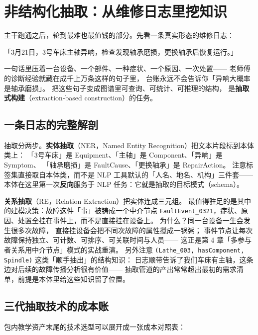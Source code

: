 \section{非结构化抽取：从维修日志里挖知识}

主干跑通之后，轮到最难也最值钱的部分。先看一条真实形态的维修日志：

\begin{center}
「3月21日，3号车床主轴异响，检查发现轴承磨损，更换轴承后恢复运行。」
\end{center}

一句话里压着一台设备、一个部件、一种症状、一个原因、一次处置——
老师傅的诊断经验就藏在成千上万条这样的句子里，
台账永远不会告诉你「异响大概率是轴承磨损」。
把这些句子变成图谱里可查询、可统计、可推理的结构，
是\textbf{抽取式构建}（extraction-based construction）的任务。

\subsection{一条日志的完整解剖}



抽取分两步。\textbf{实体抽取}（NER，Named Entity Recognition）把文本片段标到本体类上：
「3号车床」是 Equipment、「主轴」是 Component、「异响」是 Symptom、
「轴承磨损」是 FaultCause、「更换轴承」是 RepairAction。
注意标签集直接取自本体类，而不是 NLP 工具默认的「人名、地名、机构」三件套——
本体在这里第一次\textbf{反向}服务于 NLP 任务：它就是抽取的目标模式（schema）。

\textbf{关系抽取}（RE，Relation Extraction）把实体连成三元组。
最值得驻足的是其中的建模决策：故障这件「事」被铸成一个中介节点
\texttt{FaultEvent\_0321}，症状、原因、处置全挂在事件上，而不是直接挂在设备上。
为什么？同一台设备一生会发生很多次故障，
直接挂设备会把不同次故障的属性搅成一锅粥；
事件节点让每次故障保持独立、可计数、可排序、可关联时间与人员——
这正是第 4 章「多参与者关系用中介节点」模式的实战重演。
另外注意 \texttt{(Lathe\_003, hasComponent, Spindle)} 这类「顺手抽出」的结构知识：
日志顺带告诉了我们车床有主轴，这条边对后续的故障传播分析很有价值——
抽取管道的产出常常超出最初的需求清单，前提是本体里给这些知识留了位置。

\subsection{三代抽取技术的成本账}

包内教学资产末尾的技术选型可以展开成一张成本对照表：

